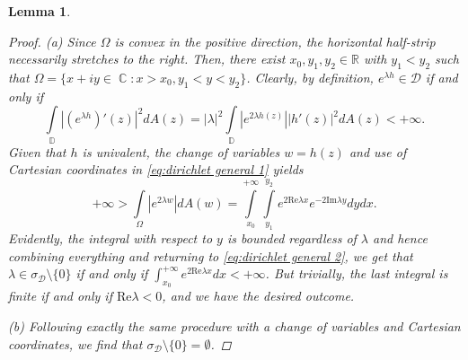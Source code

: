 \documentclass[11pt]{amsart}
\numberwithin{equation}{section}
\newtheorem{lemma}[theorem]{Lemma}
\theoremstyle{definition}
\DeclareMathOperator{\C}{\mathbb{C}}
\DeclareMathOperator{\D}{\mathbb{D}}
\begin{document}
\begin{lemma}
\begin{proof}
			(a) Since $\Omega$ is convex in the positive direction, the horizontal half-strip necessarily stretches to the right. Then, there exist $x_0,y_1,y_2\in\mathbb{R}$ with $y_1<y_2$ such that $\Omega=\{x+iy\in\C:x>x_0,y_1<y<y_2\}$. Clearly, by definition, $e^{\lambda h}\in\mathcal{D}$ if and only if
			\begin{equation}\label{eq:dirichlet general 1}
				\int\limits_{\D}\left|\left(e^{\lambda h}\right)'(z)\right|^2dA(z)=|\lambda|^2\int\limits_{\D}\left|e^{2\lambda h(z)}\right||h'(z)|^2dA(z)<+\infty.
			\end{equation}
			Given that $h$ is univalent, the change of variables $w=h(z)$ and use of Cartesian coordinates in \eqref{eq:dirichlet general 1} yields
			\begin{equation}\label{eq:dirichlet general 2}
				+\infty>\int\limits_{\Omega}|e^{2\lambda w}|dA(w)=\int\limits_{x_0}^{+\infty}\int\limits_{y_1}^{y_2}e^{2\mathrm{Re}\lambda x}e^{-2\mathrm{Im}\lambda y}dydx.
			\end{equation}
			Evidently, the integral with respect to $y$ is bounded regardless of $\lambda$ and hence combining everything and returning to \eqref{eq:dirichlet general 2}, we get that $\lambda\in\sigma_\mathcal{D}\setminus\{0\}$ if and only if $\int_{x_0}^{+\infty}e^{2\mathrm{Re}\lambda x}dx<+\infty$. But trivially, the last integral is finite if and only if $\mathrm{Re}\lambda<0$, and we have the desired outcome.
			
			(b) Following exactly the same procedure with a change of variables and Cartesian coordinates, we find that $\sigma_\mathcal{D}\setminus\{0\}=\emptyset$.
			

\end{proof}
\end{lemma}
\end{document}
